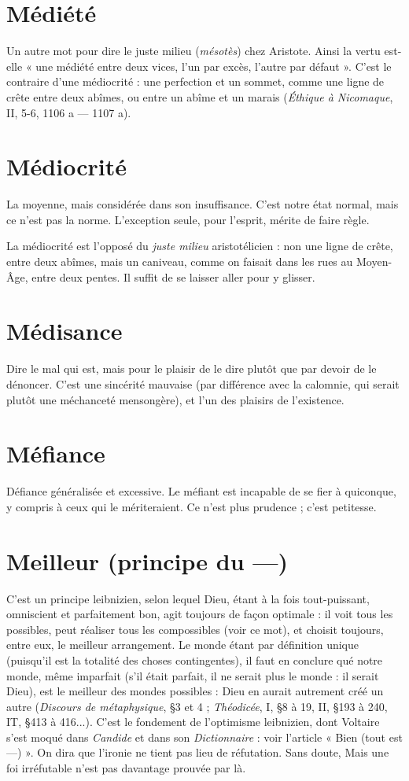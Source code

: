 \section{Médiété}
Un autre mot pour dire le juste milieu ({\it mésotès}) chez Aristote.
Ainsi la vertu est-elle « une médiété entre deux vices, l’un par
excès, l’autre par défaut ». C’est le contraire d’une médiocrité : une perfection
et un sommet, comme une ligne de crête entre deux abîmes, ou entre un abîme
et un marais ({\it Éthique à Nicomaque}, II, 5-6, 1106 a — 1107 a).

\section{Médiocrité}
La moyenne, mais considérée dans son insuffisance. C’est
notre état normal, mais ce n’est pas la norme. L’exception
seule, pour l'esprit, mérite de faire règle.

La médiocrité est l'opposé du {\it juste milieu} aristotélicien : non une ligne de
crête, entre deux abîmes, mais un caniveau, comme on faisait dans les rues au
Moyen-Âge, entre deux pentes. Il suffit de se laisser aller pour y glisser.

\section{Médisance}
Dire le mal qui est, mais pour le plaisir de le dire plutôt que
par devoir de le dénoncer. C’est une sincérité mauvaise (par
différence avec la calomnie, qui serait plutôt une méchanceté mensongère), et
l'un des plaisirs de l'existence.

\section{Méfiance}
Défiance généralisée et excessive. Le méfiant est incapable de se
fier à quiconque, y compris à ceux qui le mériteraient. Ce n’est
plus prudence ; c’est petitesse.

\section{Meilleur (principe du —)}
C'est un principe leibnizien, selon lequel
Dieu, étant à la fois tout-puissant, omniscient et parfaitement bon,
agit toujours de façon optimale : il voit tous les possibles,
peut réaliser tous les compossibles (voir ce mot), et choisit toujours,
entre eux, le meilleur arrangement. Le monde étant par définition unique
(puisqu'il est la totalité des choses contingentes), il faut en conclure qué notre
monde, même imparfait (s’il était parfait, il ne serait plus le monde : il serait
Dieu), est le meilleur des mondes possibles : Dieu en aurait autrement créé un
autre ({\it Discours de métaphysique}, \S 3 et 4 ; {\it Théodicée}, I, \S 8 à 19, II, \S 193 à
240, IT, \S 413 à 416...). C’est le fondement de l’optimisme leibnizien, dont
Voltaire s’est moqué dans {\it Candide} et dans son {\it Dictionnaire} : voir l’article
« Bien (tout est —) ». On dira que l'ironie ne tient pas lieu de réfutation. Sans
doute, Mais une foi irréfutable n’est pas davantage prouvée par là.

